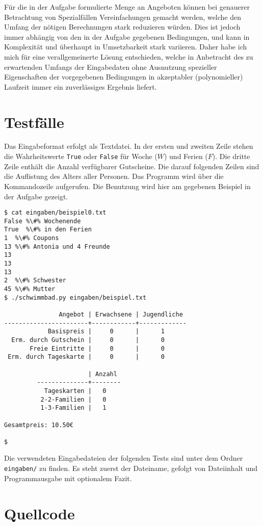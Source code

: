 \documentclass[a4paper, 12pt]{scrartcl}
\begin{document}
Für die in der Aufgabe formulierte Menge an Angeboten können bei genauerer Betrachtung von Spezialfällen Vereinfachungen gemacht werden, welche den Umfang der nötigen Berechnungen stark reduzieren würden. Dies ist jedoch immer abhängig von den in der Aufgabe gegebenen Bedingungen, und kann in Komplexität und überhaupt in Umsetzbarkeit stark variieren. Daher habe ich mich für eine verallgemeinerte Lösung entschieden, welche in Anbetracht des zu erwartenden Umfangs der Eingabedaten ohne Ausnutzung spezieller Eigenschaften der vorgegebenen Bedingungen in akzeptabler (polynomieller) Laufzeit immer ein zuverlässiges Ergebnis liefert.

\section*{Testfälle}
Das Eingabeformat erfolgt als Textdatei. In der ersten und zweiten Zeile stehen die Wahrheitswerte \texttt{True} oder \texttt{False} für Woche ($W$) und Ferien ($F$). Die dritte Zeile enthält die Anzahl verfügbarer Gutscheine. Die darauf folgenden Zeilen sind die Auflistung des Alters aller Personen. Das Programm wird über die Kommandozeile aufgerufen. Die Benutzung wird hier am gegebenen Beispiel in der Aufgabe gezeigt.

\begin{lstlisting}[escapechar=\%]
$ cat eingaben/beispiel0.txt 
False %\#% Wochenende
True  %\#% in den Ferien
1  %\#% Coupons
13 %\#% Antonia und 4 Freunde
13
13
13
2  %\#% Schwester
45 %\#% Mutter
$ ./schwimmbad.py eingaben/beispiel.txt

               Angebot | Erwachsene | Jugendliche
-----------------------+------------+-------------
            Basispreis |     0      |      1     
  Erm. durch Gutschein |     0      |      0     
       Freie Eintritte |     0      |      0     
 Erm. durch Tageskarte |     0      |      0     

                       | Anzahl
         --------------+--------
           Tageskarten |   0   
          2-2-Familien |   0   
          1-3-Familien |   1   

Gesamtpreis: 10.50€

$
\end{lstlisting}
\newpage
Die verwendeten Eingabedateien der folgenden Tests sind unter dem Ordner \texttt{eingaben/} zu finden. Es steht zuerst der Dateiname, gefolgt von Dateiinhalt und Programmausgabe mit optionalem Fazit.


\newpage
\section*{Quellcode}


\end{document}

